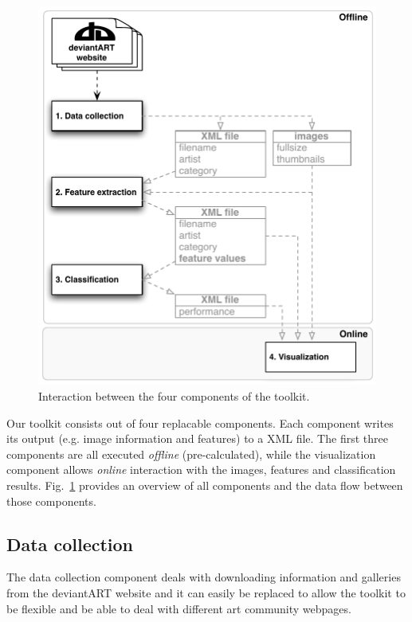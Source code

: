 \begin{figure}[htb]
  \centering
  \includegraphics[width=1\linewidth]{img/components.pdf}
  \caption{Interaction between the four components of the toolkit.}
  \label{fig:components}
\end{figure}

Our toolkit consists out of four replacable components.
Each component writes its output (e.g. image information and features) to a XML file.
The first three components are all executed \textit{offline} (pre-calculated), while the visualization component allows \textit{online} interaction with the images, features and classification results.
Fig.~\ref{fig:components} provides an overview of all components and the data flow between those components.

\subsection{Data collection}
The data collection component deals with downloading information and galleries from the deviantART website and it can easily be replaced to allow the toolkit to be flexible and be able to deal with different art community webpages.

